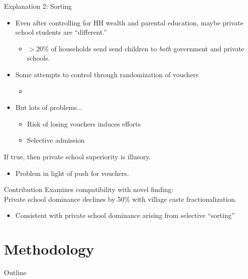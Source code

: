 \documentclass{beamer}
\begin{document}
\begin{frame}{Explanation 2: Sorting}
	\begin{itemize}
		\item Even after controlling for HH wealth and parental education, maybe private school students are ``different.''
		\pause
		\begin{itemize}
			\item $>$20\% of households send send children to \emph{both} government and private schools. 
		\end{itemize}
		\item Some attempts to control through randomization of vouchers
			\begin{itemize}
				\item \citep{Angrist:2002up, Bellei:2008uu}
			\end{itemize}
		\pause
		\item But lots of problems...
			\begin{itemize}
				\item Risk of losing vouchers induces efforts
				\item Selective admission
			\end{itemize}
	\end{itemize}	

\pause
If true, then private school superiority is illusory. 
\begin{itemize}
	\item Problem in light of push for vouchers. \\
	\citep{Chakrabarti:2008vc, Kelkar:2006tq, Panagariya:2008wi}
\end{itemize}
\end{frame}


\begin{frame}{Contribution}
	Examines compatibility with novel finding: \\
	Private school dominance declines by 50\% with village caste fractionalization.
	\pause
	\begin{itemize}
		\item Consistent with private school dominance arising from selective ``sorting''
	\end{itemize}
\end{frame}



\section{Methodology}\label{}
\begin{frame}{Outline}
	\tableofcontents[currentsection]
\end{frame}
\end{document}
